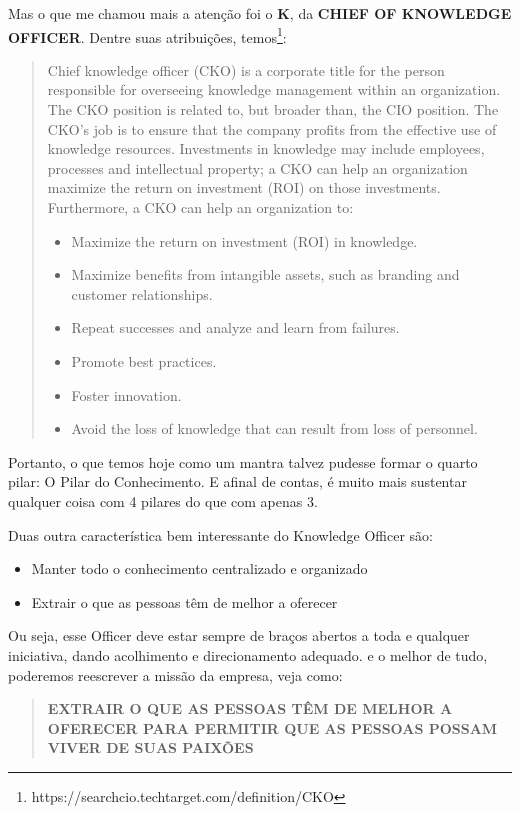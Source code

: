 \documentclass[a4paper]{article}
\begin{document}
Mas o que me chamou mais a atenção foi o \textbf{K}, da \textbf{CHIEF OF KNOWLEDGE OFFICER}. Dentre suas atribuições, temos\footnote{https://searchcio.techtarget.com/definition/CKO}:

\begin{quote}
    Chief knowledge officer (CKO) is a corporate title for the person responsible for overseeing knowledge management within an organization. The CKO position is related to, but broader than, the CIO position. The CKO's job is to ensure that the company profits from the effective use of knowledge resources. Investments in knowledge may include employees, processes and intellectual property; a CKO can help an organization maximize the return on investment (ROI) on those investments.
    Furthermore, a CKO can help an organization to:

    \begin{itemize}
        \item Maximize the return on investment (ROI) in knowledge.
        \item Maximize benefits from intangible assets, such as branding and customer relationships.
        \item Repeat successes and analyze and learn from failures.
        \item Promote best practices.
        \item Foster innovation.
        \item Avoid the loss of knowledge that can result from loss of personnel.
    \end{itemize}
\end{quote}

Portanto, o que temos hoje como um mantra talvez pudesse formar o quarto pilar: O Pilar do Conhecimento. E afinal de contas, é muito mais sustentar qualquer coisa com 4 pilares do que com apenas 3.

Duas outra característica bem interessante do Knowledge Officer são: 
\begin{itemize}
    \item Manter todo o conhecimento centralizado e organizado
    \item Extrair o que as pessoas têm de melhor a oferecer
\end{itemize}
Ou seja, esse Officer deve estar sempre de braços abertos a toda e qualquer iniciativa, dando acolhimento e direcionamento adequado. e o melhor de tudo, poderemos reescrever a missão da empresa, veja como:
\begin{quote}
    \textbf{EXTRAIR O QUE AS PESSOAS TÊM DE MELHOR A OFERECER PARA
    PERMITIR QUE AS PESSOAS POSSAM VIVER DE SUAS PAIXÕES}
\end{quote}
\end{document}
